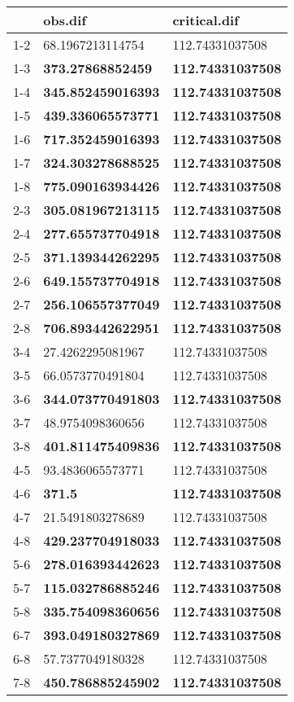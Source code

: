 \begin{table}[ht]
\centering
\begin{tabular}{rll}
  \hline
 & obs.dif & critical.dif \\ 
  \hline
1-2 & 68.1967213114754 & 112.74331037508 \\ 
  1-3 & \textbf{373.27868852459} & \textbf{112.74331037508} \\ 
  1-4 & \textbf{345.852459016393} & \textbf{112.74331037508} \\ 
  1-5 & \textbf{439.336065573771} & \textbf{112.74331037508} \\ 
  1-6 & \textbf{717.352459016393} & \textbf{112.74331037508} \\ 
  1-7 & \textbf{324.303278688525} & \textbf{112.74331037508} \\ 
  1-8 & \textbf{775.090163934426} & \textbf{112.74331037508} \\ 
  2-3 & \textbf{305.081967213115} & \textbf{112.74331037508} \\ 
  2-4 & \textbf{277.655737704918} & \textbf{112.74331037508} \\ 
  2-5 & \textbf{371.139344262295} & \textbf{112.74331037508} \\ 
  2-6 & \textbf{649.155737704918} & \textbf{112.74331037508} \\ 
  2-7 & \textbf{256.106557377049} & \textbf{112.74331037508} \\ 
  2-8 & \textbf{706.893442622951} & \textbf{112.74331037508} \\ 
  3-4 & 27.4262295081967 & 112.74331037508 \\ 
  3-5 & 66.0573770491804 & 112.74331037508 \\ 
  3-6 & \textbf{344.073770491803} & \textbf{112.74331037508} \\ 
  3-7 & 48.9754098360656 & 112.74331037508 \\ 
  3-8 & \textbf{401.811475409836} & \textbf{112.74331037508} \\ 
  4-5 & 93.4836065573771 & 112.74331037508 \\ 
  4-6 & \textbf{371.5} & \textbf{112.74331037508} \\ 
  4-7 & 21.5491803278689 & 112.74331037508 \\ 
  4-8 & \textbf{429.237704918033} & \textbf{112.74331037508} \\ 
  5-6 & \textbf{278.016393442623} & \textbf{112.74331037508} \\ 
  5-7 & \textbf{115.032786885246} & \textbf{112.74331037508} \\ 
  5-8 & \textbf{335.754098360656} & \textbf{112.74331037508} \\ 
  6-7 & \textbf{393.049180327869} & \textbf{112.74331037508} \\ 
  6-8 & 57.7377049180328 & 112.74331037508 \\ 
  7-8 & \textbf{450.786885245902} & \textbf{112.74331037508} \\ 
   \hline
\end{tabular}
\end{table}
